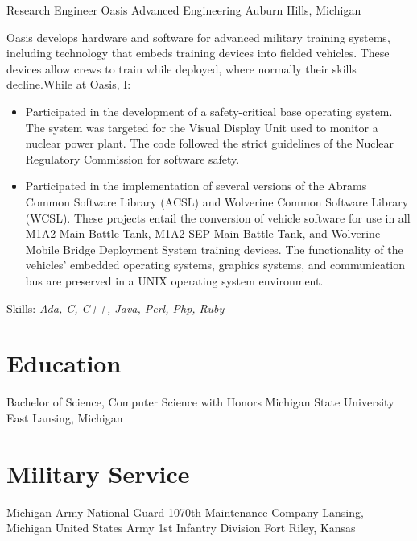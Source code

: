 \documentclass[11pt,letterpaper]{moderncv}
\begin{document}
 {Research Engineer} {Oasis Advanced Engineering} {Auburn Hills, Michigan} {} {%
  Oasis develops hardware and software for advanced military training systems,
  including technology that embeds training devices into fielded
  vehicles. These devices allow crews to train while deployed, where normally
  their skills decline.\newline While at Oasis, I:
  \begin{itemize}
  \item Participated in the development of a safety-critical base
    operating system. The system was targeted for the Visual Display
    Unit used to monitor a nuclear power plant. The code followed the
    strict guidelines of the Nuclear Regulatory Commission for
    software safety.
  \item Participated in the implementation of several versions of the
    Abrams Common Software Library (ACSL) and Wolverine Common
    Software Library (WCSL). These projects entail the conversion of
    vehicle software for use in all M1A2 Main Battle Tank, M1A2 SEP
    Main Battle Tank, and Wolverine Mobile Bridge Deployment System
    training devices. The functionality of the vehicles' embedded
    operating systems, graphics systems, and communication bus are
    preserved in a UNIX operating system environment.
  \end{itemize}
  Skills: \emph{Ada, C, C++, Java, Perl, Php, Ruby}
}


\section{Education}
 {Bachelor of Science, Computer Science with Honors} {Michigan State University} {East Lansing, Michigan} {} {}

\section{Military Service}
 {Michigan Army National Guard} {\newline1070th Maintenance Company} {Lansing, Michigan} {} {}
 {United States Army} {1st Infantry Division} {Fort Riley, Kansas} {} {}
\end{document}
